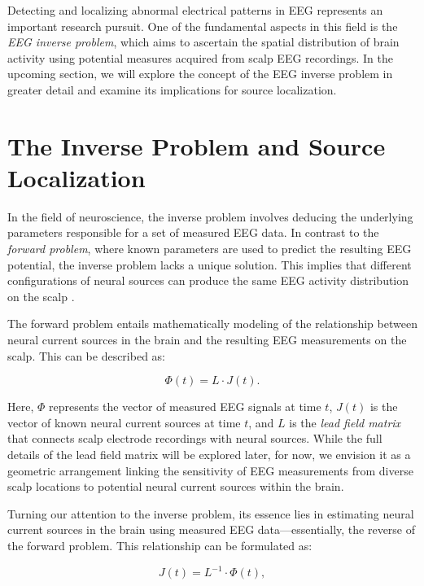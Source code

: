 \documentclass[a4paper, UKenglish, 11pt]{uiomaster}
\begin{document}
Detecting and localizing abnormal electrical patterns in EEG represents an important research pursuit. One of the fundamental aspects in this field is the \emph{EEG inverse problem}, which aims to ascertain the spatial distribution of brain activity using potential measures acquired from scalp EEG recordings. In the upcoming section, we will explore the concept of the EEG inverse problem in greater detail and examine its implications for source localization.

\section{The Inverse Problem and Source Localization}
In the field of neuroscience, the inverse problem involves deducing the underlying parameters responsible for a set of measured EEG data. In contrast to the \emph{forward problem}, where known parameters are used to predict the resulting EEG potential, the inverse problem lacks a unique solution. This implies that different configurations of neural sources can produce the same EEG activity distribution on the scalp \cite{hecker2021convdip}.

The forward problem entails mathematically modeling of the relationship between neural current sources in the brain and the resulting EEG measurements on the scalp. This can be described as:

\begin{equation}
\Phi(t) = L \cdot J(t).
\label{eq:forward_problem}
\end{equation}

Here, $\Phi$ represents the vector of measured EEG signals at time $t$, $J(t)$ is the vector of known neural current sources at time $t$, and $L$ is the \emph{lead field matrix} that connects scalp electrode recordings with neural sources. While the full details of the lead field matrix will be explored later, for now, we envision it as a geometric arrangement linking the sensitivity of EEG measurements from diverse scalp locations to potential neural current sources within the brain.

Turning our attention to the inverse problem, its essence lies in estimating neural current sources in the brain using measured EEG data—essentially, the reverse of the forward problem. This relationship can be formulated as:

\begin{equation}
J(t) = L^{-1} \cdot \Phi(t),
\label{eq:inverse_problem}
\end{equation}
\end{document}

